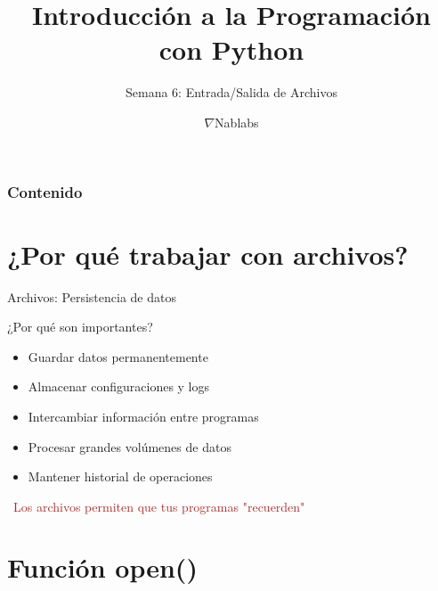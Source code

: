 \documentclass{beamer}
\title{\textbf{Introducción a la Programación con Python}}
\subtitle{Semana 6: Entrada/Salida de Archivos}
\author{$\nabla$Nablabs}
\date{}
\begin{document}
\begin{frame}
\titlepage
\end{frame}

\begin{frame}
\frametitle{Contenido}
\tableofcontents
\end{frame}

\section{¿Por qué trabajar con archivos?}

\begin{frame}{Archivos: Persistencia de datos \faFileAlt}
\begin{conceptbox}{¿Por qué son importantes?}
\small
\begin{itemize}
    \item[\faSave] Guardar datos permanentemente
    \item[\faDatabase] Almacenar configuraciones y logs
    \item[\faExchangeAlt] Intercambiar información entre programas
    \item[\faChartLine] Procesar grandes volúmenes de datos
    \item[\faHistory] Mantener historial de operaciones
\end{itemize}
\end{conceptbox}

\vspace{0.2cm}
\begin{center}
\large\textcolor{brown}{\faLightbulb\ Los archivos permiten que tus programas "recuerden"}
\end{center}
\end{frame}

\section{Función open()}
\end{document}
